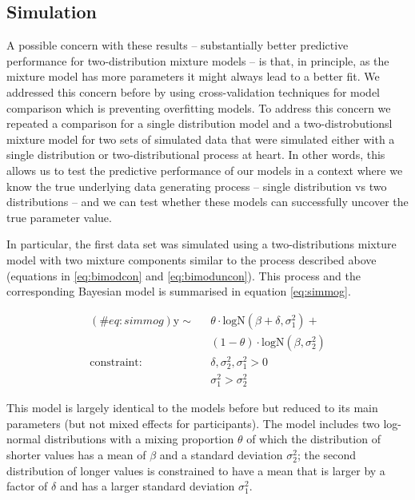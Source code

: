 \clearpage
\makeatletter
\efloat@restorefloats
\makeatother


\begin{appendix}
\section{}
\hypertarget{simulation}{%
\subsection{Simulation}\label{simulation}}

A possible concern with these results -- substantially better predictive
performance for two-distribution mixture models -- is that, in
principle, as the mixture model has more parameters it might always lead
to a better fit. We addressed this concern before by using
cross-validation techniques for model comparison which is preventing
overfitting models. To address this concern we repeated a comparison for
a single distribution model and a two-distrobutionsl mixture model for
two sets of simulated data that were simulated either with a single
distribution or two-distributional process at heart. In other words,
this allows us to test the predictive performance of our models in a
context where we know the true underlying data generating process --
single distribution vs two distributions -- and we can test whether
these models can successfully uncover the true parameter value.

In particular, the first data set was simulated using a
two-distributions mixture model with two mixture components similar to
the process described above (equations in \ref{eq:bimodcon} and
\ref{eq:bimoduncon}). This process and the corresponding Bayesian model
is summarised in equation \ref{eq:simmog}.

\begin{equation}
\begin{aligned}
(\#eq:simmog)
\text{y} \sim\text{ } & \theta \cdot \text{logN}(\beta + \delta, \sigma^2_1) +\\
& (1 - \theta) \cdot \text{logN}(\beta, \sigma^2_2)\\
\text{constraint: } & \delta, \sigma_\text{2}^2, \sigma_\text{1}^2>0\\
        & \sigma_{1}^2 > \sigma_{2}^2
\end{aligned}
\end{equation}

This model is largely identical to the models before but reduced to its
main parameters (but not mixed effects for participants). The model
includes two log-normal distributions with a mixing proportion
\(\theta\) of which the distribution of shorter values has a mean of
\(\beta\) and a standard deviation \(\sigma^2_2\); the second
distribution of longer values is constrained to have a mean that is
larger by a factor of \(\delta\) and has a larger standard deviation
\(\sigma^2_1\).


\end{appendix}
